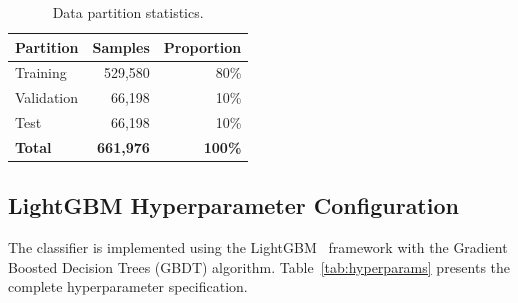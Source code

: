 \documentclass[a4paper,12pt]{article}
\begin{document}
\begin{table}[H]
\centering
\caption{Data partition statistics.}
\label{tab:split}
\begin{tabular}{lrr}
\toprule
\textbf{Partition} & \textbf{Samples} & \textbf{Proportion} \\
\midrule
Training   & 529,580 & 80\% \\
Validation &  66,198 & 10\% \\
Test       &  66,198 & 10\% \\
\midrule
\textbf{Total} & \textbf{661,976} & \textbf{100\%} \\
\bottomrule
\end{tabular}
\end{table}

\subsection{LightGBM Hyperparameter Configuration}
\label{sec:hyperparams}

The classifier is implemented using the LightGBM~\cite{lightgbm} framework with the Gradient Boosted Decision Trees (GBDT) algorithm. Table~\ref{tab:hyperparams} presents the complete hyperparameter specification.
\end{document}
